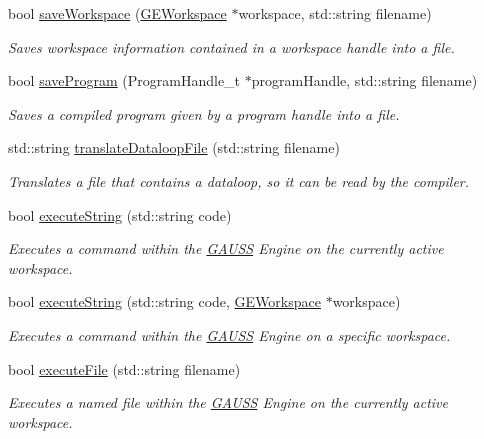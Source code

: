 \begin{DoxyCompactItemize}
bool \hyperlink{class_g_a_u_s_s_a7bca1d6810ef2a67a53bacc1ddb9a8c0}{save\-Workspace} (\hyperlink{class_g_e_workspace}{G\-E\-Workspace} $\ast$workspace, std\-::string filename)
\begin{DoxyCompactList}\small\item\em Saves workspace information contained in a workspace handle into a file. \end{DoxyCompactList}\item 
bool \hyperlink{class_g_a_u_s_s_a65b726ddf768f24b4c9bdbec4bc668a4}{save\-Program} (Program\-Handle\-\_\-t $\ast$program\-Handle, std\-::string filename)
\begin{DoxyCompactList}\small\item\em Saves a compiled program given by a program handle into a file. \end{DoxyCompactList}\item 
std\-::string \hyperlink{class_g_a_u_s_s_aba7db184b734820e056d37d6880a65a7}{translate\-Dataloop\-File} (std\-::string filename)
\begin{DoxyCompactList}\small\item\em Translates a file that contains a dataloop, so it can be read by the compiler. \end{DoxyCompactList}\item 
bool \hyperlink{class_g_a_u_s_s_a3680b0addd695d8a5690a1e2d3fc0d8b}{execute\-String} (std\-::string code)
\begin{DoxyCompactList}\small\item\em Executes a command within the \hyperlink{class_g_a_u_s_s}{G\-A\-U\-S\-S} Engine on the currently active workspace. \end{DoxyCompactList}\item 
bool \hyperlink{class_g_a_u_s_s_add35ed82380ee718cb2638350956ee9c}{execute\-String} (std\-::string code, \hyperlink{class_g_e_workspace}{G\-E\-Workspace} $\ast$workspace)
\begin{DoxyCompactList}\small\item\em Executes a command within the \hyperlink{class_g_a_u_s_s}{G\-A\-U\-S\-S} Engine on a specific workspace. \end{DoxyCompactList}\item 
bool \hyperlink{class_g_a_u_s_s_a949037ab9f5c49d94a0c7962dac0548d}{execute\-File} (std\-::string filename)
\begin{DoxyCompactList}\small\item\em Executes a named file within the \hyperlink{class_g_a_u_s_s}{G\-A\-U\-S\-S} Engine on the currently active workspace. \end{DoxyCompactList}\item 

\end{DoxyCompactItemize}
